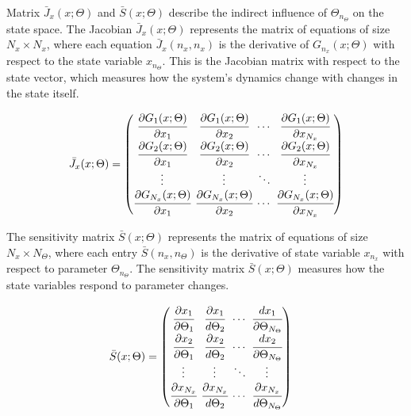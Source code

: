 \documentclass[a4paper,fleqn]{cas-dc}
\begin{document}
	Matrix ${\bar{J}_x}(x;\Theta)$ and $\bar{S}(x;\Theta)$ describe the indirect influence of $\Theta_{n_\Theta}$ on the state space. The Jacobian ${\bar{J}_x}(x;\Theta)$ represents the matrix of equations of size $N_x \times N_x$, where each equation ${\bar{J}_x}(n_x,n_x)$ is the derivative of $G_{n_x}(x;\Theta)$ with respect to the state variable $x_{n_\Theta}$. {\color{blue}This is the Jacobian matrix with respect to the state vector, which measures how the system’s dynamics change with changes in the state itself.}
	
	{\footnotesize
		\begin{align}
			\begingroup %
			\setlength\arraycolsep{2pt}
			{\bar{J}_x}(x;\Theta)=\begin{pmatrix}
				\cfrac{\partial {G_{1}}(x;\Theta)}{\partial {x_{1}}} & \cfrac{\partial {G_{1}}(x;\Theta)}{\partial {x_{2}}} & \cdots & \cfrac{\partial {G_{1}}(x;\Theta)}{\partial {x_{N_x}}}\\
				\cfrac{\partial {G_{2}}(x;\Theta)}{\partial {x_{1}}} & \cfrac{\partial {G_{2}}(x;\Theta)}{\partial {x_{2}}} & \cdots & \cfrac{\partial {G_{2}}(x;\Theta)}{\partial {x_{N_x}}}\\
				\vdots & \vdots & \ddots & \vdots\\ 
				\cfrac{\partial {G_{N_x}}(x;\Theta)}{\partial {x_{1}}} & \cfrac{\partial {G_{N_x}}(x;\Theta)}{\partial {x_{2}}} & \cdots & \cfrac{\partial {G_{N_x}}(x;\Theta)}{\partial {x_{N_x}}}\\
			\end{pmatrix}
			\endgroup
	\end{align} }
	
	The sensitivity matrix $\bar{S}(x;\Theta)$ represents the matrix of equations of size $N_x \times N_\Theta$, where each entry $\bar{S}(n_x,n_\Theta)$ is the derivative of state variable $x_{n_x}$ with respect to parameter $\Theta_{n_\Theta}$. {\color{blue}The sensitivity matrix $\bar{S}(x;\Theta)$ measures how the state variables respond to parameter changes.}
	
	{\footnotesize
		\begin{equation}
			\begin{split}
				\bar{S}(x;\Theta) & = 
				\begingroup %
				\setlength\arraycolsep{2pt}
				\begin{pmatrix}
					\cfrac{\partial {x_{1}}}{\partial {\Theta_{1}}} 	& \cfrac{\partial {x_{1}}}{d {\Theta_{2}}}     & \cdots & \cfrac{d {x_{1}}}{\partial {\Theta_{N_\Theta}}}\\
					\cfrac{\partial {x_{2}}}{\partial {\Theta_{1}}} 	& \cfrac{\partial {x_{2}}}{d {\Theta_{2}}}     & \cdots & \cfrac{d {x_{2}}}{\partial {\Theta_{N_\Theta}}}\\
					\vdots					 	    & \vdots 					   	  & \ddots & \vdots\\
					\cfrac{\partial {x_{N_x}}}{\partial {\Theta_{1}}} 	& \cfrac{\partial {x_{N_x}}}{d {\Theta_{2}}}     & \cdots & \cfrac{\partial {x_{N_x}}}{d {\Theta_{N_\Theta}}}
				\end{pmatrix} 
				\endgroup
			\end{split}
	\end{equation} }
	
\end{document}
